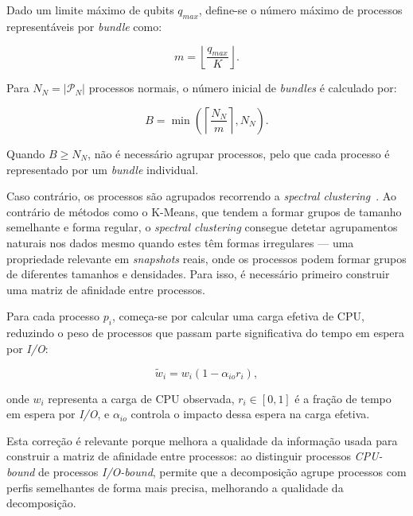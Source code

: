 Dado um limite máximo de qubits $q_{max}$, define-se o número máximo de processos representáveis por \textit{bundle} como:

\begin{equation}
    m = \left\lfloor \frac{q_{max}}{K} \right\rfloor.
\end{equation}

Para $N_N = |\mathcal{P}_{N}|$ processos normais, o número inicial de \textit{bundles} é calculado por:

\begin{equation}
    B = \min\left(
        \left\lceil \frac{N_N}{m} \right\rceil,
        N_N
    \right).
\end{equation}

Quando $B \geq N_N$, não é necessário agrupar processos, pelo que cada processo é
representado por um \textit{bundle} individual.

Caso contrário, os processos são
agrupados recorrendo a \textit{spectral clustering}~\cite{Ng2001Spectral}. Ao contrário
de métodos como o K-Means, que tendem a formar grupos de tamanho semelhante e forma
regular, o \textit{spectral clustering} consegue detetar agrupamentos naturais nos
dados mesmo quando estes têm formas irregulares --- uma propriedade relevante em
\textit{snapshots} reais, onde os processos podem formar grupos de diferentes tamanhos
e densidades. Para isso, é necessário primeiro construir uma matriz de afinidade entre
processos.


Para cada processo $p_i$, começa-se por calcular uma carga efetiva de \acs{CPU}, reduzindo o peso de processos que passam parte significativa do tempo em espera por \textit{I/O}:

\begin{equation}
    \tilde{w}_i =
    w_i \left(1 - \alpha_{io} r_i \right),
\end{equation}

onde $w_i$ representa a carga de \acs{CPU} observada, $r_i \in [0,1]$ é a fração de tempo em espera por \textit{I/O}, e $\alpha_{io}$ controla o impacto dessa espera na carga efetiva.

Esta correção é relevante porque melhora a qualidade da informação usada para
construir a matriz de afinidade entre processos: ao distinguir processos
\emph{CPU-bound} de processos \emph{I/O-bound}, permite que a decomposição
agrupe processos com perfis semelhantes de forma mais precisa, melhorando a
qualidade da decomposição.

